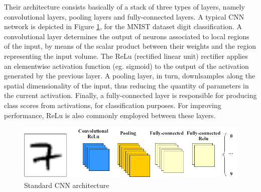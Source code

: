 Their architecture consists basically of a stack of three types of layers, namely convolutional layers, pooling layers and fully-connected layers. A typical CNN network is depicted in Figure \ref{fig:mnist}, for the MNIST dataset digit classification. A convolutional layer determines the output of neurons associated to local regions of the input, by means of the scalar product between their weights and the region representing the input volume. The ReLu (rectified linear unit) rectifier applies an elementwise activation function (eg. sigmoid) to the output of the activation  generated by the previous layer. A pooling layer, in turn,  downlsamples along the spatial dimensionality of the input, thus reducing the quantity of parameters in the current activation. Finally, a fully-connected layer is responsible for producing class scores from activations, for classification purposes. For improving performance, ReLu is also commonly employed between these layers. 


\begin{figure}[h]
\caption{Standard CNN architecture}
\label{fig:mnist}
  \includegraphics[width=\textwidth]{images/CNN.png}
\end{figure}
